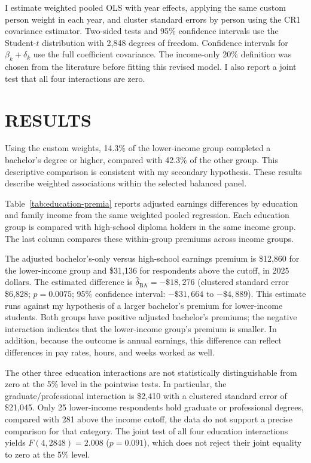 \documentclass[12pt,letterpaper]{article}
\begin{document}
I estimate weighted pooled OLS with year effects, applying the same custom person
weight in each year, and cluster standard errors by person using the CR1 covariance
estimator. Two-sided tests and 95\% confidence intervals use the Student-$t$
distribution with 2,848 degrees of freedom. Confidence intervals for
$\beta_k+\delta_k$ use the full coefficient covariance. The income-only 20\%
definition was chosen from the literature before fitting this revised model. I also 
report a joint test that all four interactions are zero. \newline

\section*{RESULTS}
Using the custom weights, 14.3\% of the lower-income group completed a bachelor's
degree or higher, compared with 42.3\% of the other group. This descriptive comparison
is consistent with my secondary hypothesis. These results describe weighted
associations within the selected balanced panel.\newline

Table~\ref{tab:education-premia} reports adjusted earnings differences by education
and family income from the same weighted pooled regression. Each education group
is compared with high-school diploma holders in the same income group. The last
column compares these within-group premiums across income groups.\newline


The adjusted bachelor's-only versus high-school earnings premium is \$12,860 for
the lower-income group and \$31,136 for respondents above the cutoff, in 2025 dollars.
The estimated difference is $\hat\delta_{\mathrm{BA}}=-\$18,276$
(clustered standard error \$6,828; $p=0.0075$; 95\% confidence interval:
$-\$31,664$ to $-\$4,889$). This estimate runs against my hypothesis of a larger
bachelor's premium for lower-income students. Both groups have positive adjusted
bachelor's premiums; the negative interaction indicates that the lower-income
group's premium is smaller. In addition, because the outcome is annual earnings, 
this difference can reflect differences in pay rates, hours, and weeks worked as well.\newline

The other three education interactions are not statistically distinguishable from
zero at the 5\% level in the pointwise tests. In particular, the graduate/professional
interaction is \$2,410 with a clustered standard error of \$21,045. Only 25
lower-income respondents hold graduate or professional degrees, compared with
281 above the income cutoff, the data do not support a precise comparison for
that category. The joint test of all four education interactions yields
$F(4,2848)=2.008$ ($p=0.091$), which does not reject their joint equality to zero
at the 5\% level.\newline
\end{document}
